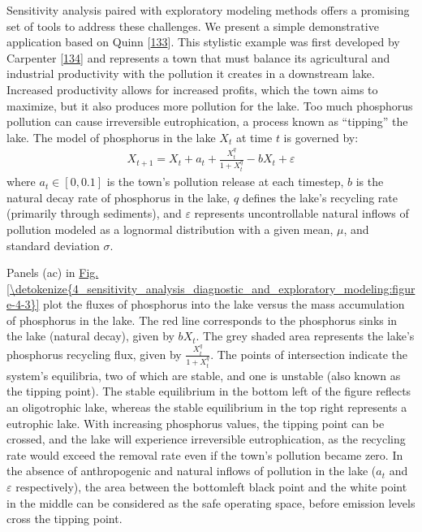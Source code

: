 \documentclass[letterpaper,10pt,english]{sphinxmanual}
\begin{document}
\sphinxAtStartPar
Sensitivity analysis paired with exploratory modeling methods offers a promising set of tools to address these challenges. We present a simple demonstrative application based on Quinn  {[}\hyperlink{cite.index:id61}{133}{]}. This stylistic example was first developed by Carpenter  {[}\hyperlink{cite.index:id163}{134}{]} and represents a town that must balance its agricultural and industrial productivity with the pollution it creates in a downstream lake. Increased productivity allows for increased profits, which the town aims to maximize, but it also produces more pollution for the lake. Too much phosphorus pollution can cause irreversible eutrophication, a process known as “tipping” the lake. The model of phosphorus in the lake \(X_t\) at time \(t\) is governed by:
\begin{equation*}
\begin{split}X_{t+1}= X_{t}+a_{t}+\frac{X_{t}^q} {1+X_{t}^q}-bX_t+\varepsilon\end{split}
\end{equation*}
\sphinxAtStartPar
where \(a_t \in [0,0.1]\) is the town’s pollution release at each timestep, \(b\) is the natural decay rate of phosphorus in the lake, \(q\) defines the lake’s recycling rate (primarily through sediments), and \(\varepsilon\) represents uncontrollable natural inflows of pollution modeled as a log\sphinxhyphen{}normal distribution with a given mean, \(\mu\), and standard deviation \(\sigma\).

\sphinxAtStartPar
Panels (a\sphinxhyphen{}c) in \hyperref[\detokenize{4_sensitivity_analysis_diagnostic_and_exploratory_modeling:figure-4-3}]{Fig.\@ \ref{\detokenize{4_sensitivity_analysis_diagnostic_and_exploratory_modeling:figure-4-3}}} plot the fluxes of phosphorus into the lake versus the mass accumulation of phosphorus in the lake. The red line corresponds to the phosphorus sinks in the lake (natural decay), given by \(bX_t\). The grey shaded area represents the lake’s phosphorus recycling flux, given by \(\frac{X_{t}^q} {1+X_{t}^q}\). The points of intersection indicate the system’s equilibria, two of which are stable, and one is unstable (also known as the tipping point). The stable equilibrium in the bottom left of the figure reflects an oligotrophic lake, whereas the stable equilibrium in the top right represents a eutrophic lake. With increasing phosphorus values, the tipping point can be crossed, and the lake will experience irreversible eutrophication, as the recycling rate would exceed the removal rate even if the town’s pollution became zero. In the absence of anthropogenic and natural inflows of pollution in the lake (\(a_t\) and \(\varepsilon\) respectively), the area between the bottom\sphinxhyphen{}left black point and the white point in the middle can be considered as the safe operating space, before emission levels cross the tipping point.
\end{document}
